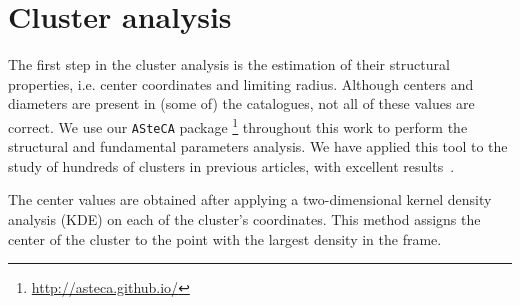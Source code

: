 \documentclass{aa}
\begin{document}
\section{Cluster analysis}
 \label{sec:clust_analy}

 The first step in the cluster analysis is the estimation of their structural
 properties, i.e. center coordinates and limiting radius. Although centers and
 diameters are present in (some of) the catalogues, not all of these values are
 correct. We use our \texttt{ASteCA} package
 \citep{Perren_2015}\footnote{\url{http://asteca.github.io/}} throughout this
 work to perform the structural and fundamental parameters analysis. We have
 applied this tool to the study of hundreds of clusters in previous articles,
 with excellent results~\citep{Perren_2017,Perren_2020}.

 The center values are obtained after applying a two-dimensional kernel density
 analysis (KDE) on each of the cluster's coordinates. This method assigns the
 center of the cluster to the point with the largest density in the frame. 
\end{document}

